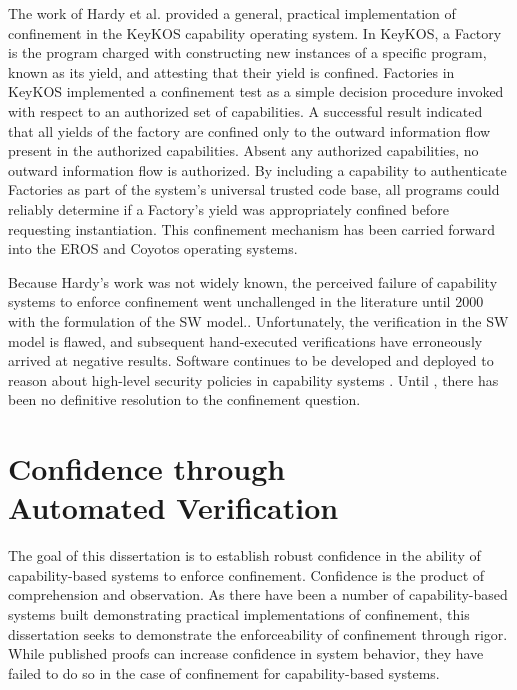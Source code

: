The work of Hardy et al. provided a general, practical implementation of confinement in the KeyKOS capability operating system. \citeKeyKOS{}
In KeyKOS, a Factory is the program charged with constructing new instances of a specific program, known as its yield, and attesting that their yield is confined. \cite{Hardy:KeyKOS:Factory:Patent}
Factories in KeyKOS implemented a confinement test as a simple decision procedure invoked with respect to an authorized set of capabilities.
A successful result indicated that all yields of the factory are confined only to the outward information flow present in the authorized capabilities.
Absent any authorized capabilities, no outward information flow is authorized.
By including a capability to authenticate Factories as part of the system's universal trusted code base, all programs could reliably determine if a Factory's yield was appropriately confined before requesting instantiation.
This confinement mechanism has been carried forward into the EROS and Coyotos operating systems.

Because Hardy's work was not widely known, the perceived failure of capability systems to enforce confinement went unchallenged in the literature until 2000 with the formulation of the SW model.\cite{ShapiroWeber2000}.
Unfortunately, the verification in the SW model is flawed, and subsequent hand-executed verifications have erroneously arrived at negative results. \cite{Chander01astate-transition}
Software continues to be developed and deployed to reason about high-level security policies in capability systems \cite{Spiessens07patternsof} \cite{seL4:Verified}.
Until \TMmodelName{}, there has been no definitive resolution to the confinement question.

\section[Confidence through Automated Verification]{Confidence through \\ Automated Verification}
\label{sect:intro:confidence}

The goal of this dissertation is to establish robust confidence in the ability of capability-based systems to enforce confinement.
Confidence is the product of comprehension and observation.
As there have been a number of capability-based systems built demonstrating practical implementations of confinement, this dissertation seeks to demonstrate the enforceability of confinement through rigor.
While published proofs can increase confidence in system behavior, they have failed to do so in the case of confinement for capability-based systems.

